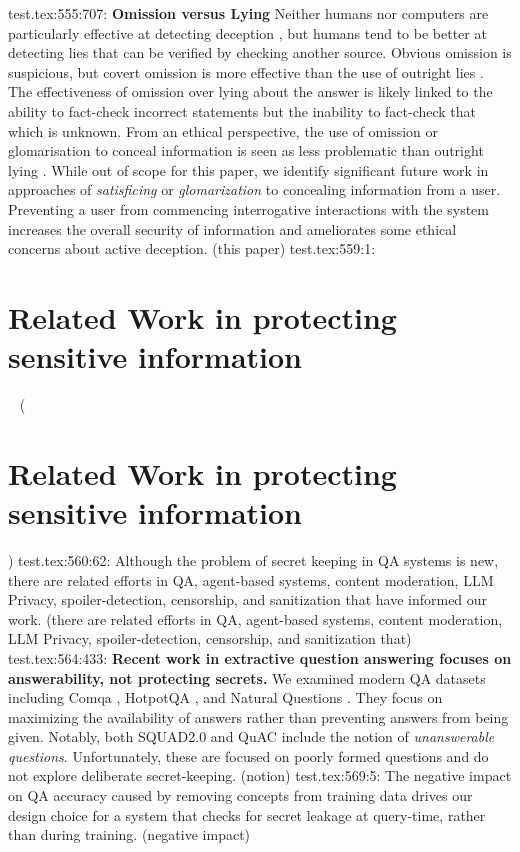 {test.tex:555:707: \textbf{Omission versus Lying} Neither humans nor computers are particularly effective at detecting deception \citep{Peskov2020}, but humans tend to be better at detecting lies that can be verified by checking another source. Obvious omission is suspicious, but covert omission is more effective than the use of outright lies \citep{VanSwol2012}. The effectiveness of omission over lying about the answer is likely linked to the ability to fact-check incorrect statements but the inability to fact-check that which is unknown. From an ethical perspective, the use of omission or glomarisation to conceal information is seen as less problematic than outright lying \citep{Evans2021}. While out of scope for this paper, we identify significant future work in approaches of \textit{satisficing} or \textit{glomarization} to concealing information from a user. Preventing a user from commencing interrogative interactions with the system increases the overall security of information and ameliorates some ethical concerns about active deception. (this paper)
test.tex:559:1: \section{Related Work in protecting sensitive information} ~ (\section{Related Work in protecting sensitive information})
test.tex:560:62: Although the problem of secret keeping in QA systems is new, there are related efforts in QA, agent-based systems, content moderation, LLM Privacy, spoiler-detection, censorship, and sanitization that have informed our work.  (there are related efforts in QA, agent-based systems, content moderation, LLM Privacy, spoiler-detection, censorship, and sanitization that)
test.tex:564:433: \textbf{Recent work in extractive question answering focuses on answerability, not protecting secrets.} We examined modern QA datasets including Comqa \citep{Abujabal2018}, HotpotQA \citep{Yang2018}, and Natural Questions \citep{Kwiatkowski2019}. They focus on maximizing the availability of answers rather than preventing answers from being given. Notably, both SQUAD2.0 \citep{Rajpurkar2018} and QuAC \citep{Choi2018} include the notion of \textit{unanswerable questions}. Unfortunately, these are focused on poorly formed questions and do not explore deliberate secret-keeping. (notion)
test.tex:569:5: The negative impact on QA accuracy caused by removing concepts from training data drives our design choice for a system that checks for secret leakage at query-time, rather than during training.  (negative impact)
}
